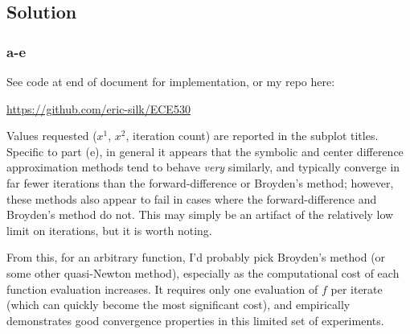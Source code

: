 \documentclass[11pt]{report}
\theoremstyle{definition}
\begin{document}
\subsection*{Solution}
\subsubsection*{a-e}
See code at end of document for implementation, or my repo here:
\begin{center}
	\href{https://github.com/eric-silk/ECE530}{https://github.com/eric-silk/ECE530}
\end{center}

Values requested ($x^1$, $x^2$, iteration count) are reported in the subplot
titles.  Specific to part (e), in general it appears that the symbolic and
center difference approximation methods tend to behave \textit{very} similarly,
and typically converge in far fewer iterations than the forward-difference or
Broyden's method; however, these methods also appear to fail in cases where the
forward-difference and Broyden's method do not. This may simply be an artifact
of the relatively low limit on iterations, but it is worth noting.

From this, for an arbitrary function, I'd probably pick Broyden's method (or
some other quasi-Newton method), especially as the computational cost of each
function evaluation increases.  It requires only one evaluation of $f$ per
iterate (which can quickly become the most significant cost), and empirically
demonstrates good convergence properties in this limited set of experiments.
\end{document}
